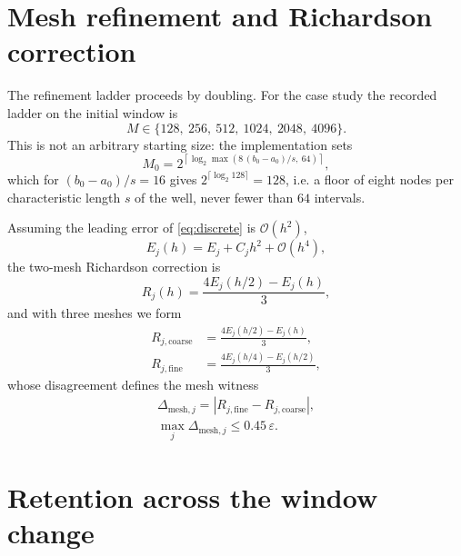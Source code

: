 \documentclass[twocolumn,10pt,a4paper]{article}
\theoremstyle{plain}
\theoremstyle{definition}
\newcommand{\eps}{\varepsilon}
\begin{document}
\section{Mesh refinement and Richardson correction}
\label{sec:mesh}

The refinement ladder proceeds by doubling. For the case study the recorded
ladder on the initial window is
\begin{equation}
M \in \{128,\ 256,\ 512,\ 1024,\ 2048,\ 4096\}.
\label{eq:ladder}
\end{equation}
This is not an arbitrary starting size: the implementation sets
\begin{equation}
M_{0} = 2^{\left\lceil \log_{2}\max\!\left(8\,(b_{0}-a_{0})/s,\ 64\right)
\right\rceil},
\label{eq:m0}
\end{equation}
which for $(b_{0}-a_{0})/s = 16$ gives $2^{\lceil\log_{2}128\rceil} = 128$, i.e.
a floor of eight nodes per characteristic length $s$ of the well, never fewer
than $64$ intervals.

Assuming the leading error of \eqref{eq:discrete} is $\mathcal{O}(h^{2})$,
\begin{equation}
E_{j}(h) = E_{j} + C_{j}h^{2} + \mathcal{O}(h^{4}),
\label{eq:expansion}
\end{equation}
the two-mesh Richardson correction \citep{richardson1911} is
\begin{equation}
R_{j}(h) = \frac{4E_{j}(h/2) - E_{j}(h)}{3},
\end{equation}
and with three meshes we form
\begin{equation}
\begin{aligned}
R_{j,\mathrm{coarse}} &= \frac{4E_{j}(h/2) - E_{j}(h)}{3},\\
R_{j,\mathrm{fine}} &= \frac{4E_{j}(h/4) - E_{j}(h/2)}{3},
\end{aligned}
\end{equation}
whose disagreement defines the mesh witness
\begin{equation}
\begin{gathered}
\Delta_{\mathrm{mesh},j} =
\left| R_{j,\mathrm{fine}} - R_{j,\mathrm{coarse}} \right|,\\
\max_{j}\Delta_{\mathrm{mesh},j} \le 0.45\,\eps .
\end{gathered}
\label{eq:meshgate}
\end{equation}

\section{Retention across the window change}
\label{sec:retain}
\end{document}
